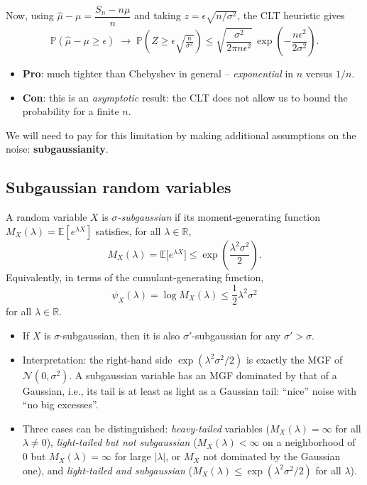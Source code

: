 Now, using $\hat{\mu} - \mu = \dfrac{S_n - n\mu}{n}$ and taking $z = \epsilon\sqrt{n/\sigma^2}$, the CLT heuristic gives
\[
\mathbb{P}(\hat{\mu} - \mu \geq \epsilon) \;\longrightarrow\; \mathbb{P}\left(Z \geq \epsilon\sqrt{\tfrac{n}{\sigma^2}}\right) \leq \sqrt{\frac{\sigma^2}{2\pi n \epsilon^2}}\, \exp\left(-\frac{n\epsilon^2}{2\sigma^2}\right).
\]

\begin{itemize}
    \item \textbf{Pro}: much tighter than Chebyshev in general -- \emph{exponential} in $n$ versus $1/n$.
    \item \textbf{Con}: this is an \emph{asymptotic} result: the CLT does not allow us to bound the probability for a finite $n$.
\end{itemize}
We will need to pay for this limitation by making additional assumptions on the noise: \textbf{subgaussianity}.

\subsection{Subgaussian random variables}

\begin{definition}
A random variable $X$ is \emph{$\sigma$-subgaussian} if its moment-generating function $M_X(\lambda) = \mathbb{E}[e^{\lambda X}]$ satisfies, for all $\lambda \in \mathbb{R}$,
\[
M_X(\lambda) = \mathbb{E}\big[e^{\lambda X}\big] \leq \exp\left(\frac{\lambda^2\sigma^2}{2}\right).
\]
Equivalently, in terms of the cumulant-generating function, \[
  \psi_X(\lambda) = \log M_X(\lambda) \leq \frac{1}{2}\lambda^2\sigma^2
\] for all $\lambda \in \mathbb{R}$.
\end{definition}

\begin{remark}
\begin{itemize}
    \item If $X$ is $\sigma$-subgaussian, then it is also $\sigma'$-subgaussian for any $\sigma' > \sigma$.
    \item Interpretation: the right-hand side $\exp(\lambda^2\sigma^2/2)$ is exactly the MGF of $\mathcal{N}(0,\sigma^2)$. A subgaussian variable has an MGF dominated by that of a Gaussian, i.e., its tail is at least as light as a Gaussian tail: ``nice'' noise with ``no big excesses''.
    \item Three cases can be distinguished: \emph{heavy-tailed} variables ($M_X(\lambda) = \infty$ for all $\lambda \neq 0$), \emph{light-tailed but not subgaussian} ($M_X(\lambda) < \infty$ on a neighborhood of $0$ but $M_X(\lambda) = \infty$ for large $|\lambda|$, or $M_X$ not dominated by the Gaussian one), and \emph{light-tailed and subgaussian} ($M_X(\lambda) \leq \exp(\lambda^2\sigma^2/2)$ for all $\lambda$).
\end{itemize}
\end{remark}

